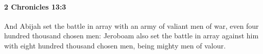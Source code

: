 
		\paragraph{2 Chronicles 13:3} %
			\label{2CHRONICLES-13-3}

			And Abijah set the battle in array with an army of valiant men of war, even four hundred thousand chosen men: Jeroboam also set the battle in array against him with eight hundred thousand chosen men, being mighty men of valour.


